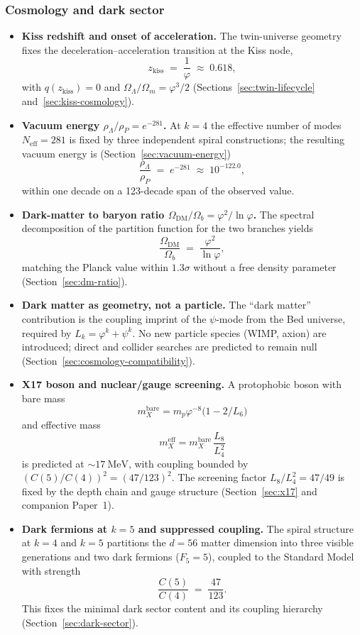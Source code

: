\subsubsection*{Cosmology and dark sector}

\begin{itemize}[nosep,leftmargin=*]
\item \textbf{Kiss redshift and onset of acceleration.}
  The twin-universe geometry fixes the deceleration--acceleration transition at
  the Kiss node,
  \[
    z_{\mathrm{kiss}} \;=\; \frac{1}{\varphi} \;\approx\; 0.618,
  \]
  with $q(z_{\mathrm{kiss}})=0$ and $\Omega_\Lambda/\Omega_m = \varphi^3/2$
  (Sections~\ref{sec:twin-lifecycle} and~\ref{sec:kiss-cosmology}).

\item \textbf{Vacuum energy $\rho_\Lambda/\rho_P = e^{-281}$.}
  At $k=4$ the effective number of modes $N_{\mathrm{eff}}=281$ is fixed by
  three independent spiral constructions; the resulting vacuum energy is
  (Section~\ref{sec:vacuum-energy})
  \[
    \frac{\rho_\Lambda}{\rho_P} \;=\; e^{-281} \;\approx\; 10^{-122.0},
  \]
  within one decade on a 123-decade span of the observed value.

\item \textbf{Dark-matter to baryon ratio $\Omega_{\mathrm{DM}}/\Omega_b
  = \varphi^2/\ln\varphi$.}
  The spectral decomposition of the partition function for the two branches
  yields
  \[
    \frac{\Omega_{\mathrm{DM}}}{\Omega_b}
      \;=\; \frac{\varphi^2}{\ln\varphi},
  \]
  matching the Planck value within $1.3\sigma$ without a free density parameter
  (Section~\ref{sec:dm-ratio}).

\item \textbf{Dark matter as geometry, not a particle.}
  The “dark matter” contribution is the coupling imprint of the $\psi$-mode
  from the Bed universe, required by $L_k = \varphi^k + \psi^k$.
  No new particle species (WIMP, axion) are introduced; direct and collider
  searches are predicted to remain null (Section~\ref{sec:cosmology-compatibility}).

\item \textbf{X17 boson and nuclear/gauge screening.}
  A protophobic boson with bare mass
  \[
    m_X^{\mathrm{bare}} = m_p \varphi^{-8}\bigl(1 - 2/L_6\bigr)
  \]
  and effective mass
  \[
    m_X^{\mathrm{eff}} = m_X^{\mathrm{bare}}\,\frac{L_8}{L_4^2}
  \]
  is predicted at $\sim 17~\mathrm{MeV}$, with coupling bounded by
  $(C(5)/C(4))^2 = (47/123)^2$.  The screening factor $L_8/L_4^2 = 47/49$
  is fixed by the depth chain and gauge structure (Section~\ref{sec:x17} and
  companion Paper~1).

\item \textbf{Dark fermions at $k=5$ and suppressed coupling.}
  The spiral structure at $k=4$ and $k=5$ partitions the $d=56$ matter
  dimension into three visible generations and two dark fermions ($F_5=5$),
  coupled to the Standard Model with strength
  \[
    \frac{C(5)}{C(4)} \;=\; \frac{47}{123}.
  \]
  This fixes the minimal dark sector content and its coupling hierarchy
  (Section~\ref{sec:dark-sector}).
\end{itemize}

